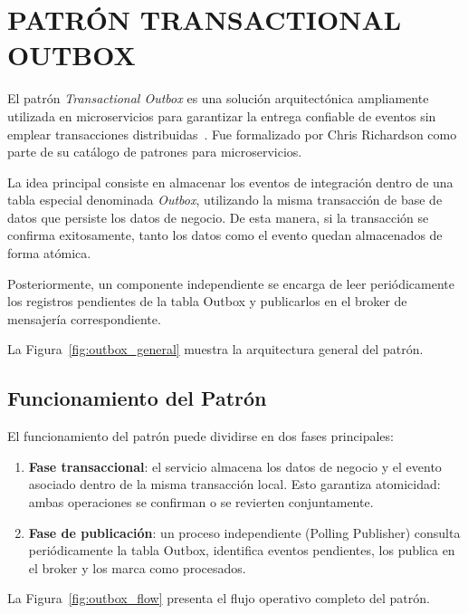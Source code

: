 \section{PATRÓN TRANSACTIONAL OUTBOX}

El patrón \textit{Transactional Outbox} es una solución arquitectónica ampliamente utilizada en microservicios para garantizar la entrega confiable de eventos sin emplear transacciones distribuidas~\parencite{richardson2018}. Fue formalizado por Chris Richardson como parte de su catálogo de patrones para microservicios.

La idea principal consiste en almacenar los eventos de integración dentro de una tabla especial denominada \textit{Outbox}, utilizando la misma transacción de base de datos que persiste los datos de negocio. De esta manera, si la transacción se confirma exitosamente, tanto los datos como el evento quedan almacenados de forma atómica.

Posteriormente, un componente independiente se encarga de leer periódicamente los registros pendientes de la tabla Outbox y publicarlos en el broker de mensajería correspondiente.

La Figura~\ref{fig:outbox_general} muestra la arquitectura general del patrón.



\subsection{Funcionamiento del Patrón}

El funcionamiento del patrón puede dividirse en dos fases principales:

\begin{enumerate}
    \item \textbf{Fase transaccional}: el servicio almacena los datos de negocio y el evento asociado dentro de la misma transacción local. Esto garantiza atomicidad: ambas operaciones se confirman o se revierten conjuntamente.
    \item \textbf{Fase de publicación}: un proceso independiente (Polling Publisher) consulta periódicamente la tabla Outbox, identifica eventos pendientes, los publica en el broker y los marca como procesados.
\end{enumerate}

La Figura~\ref{fig:outbox_flow} presenta el flujo operativo completo del patrón.



